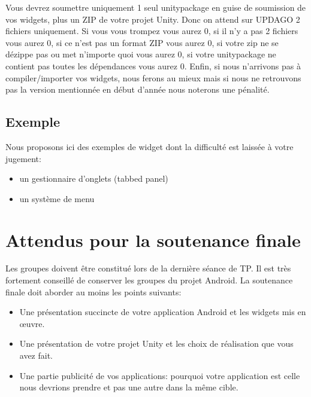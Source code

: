 \documentclass[a4paper,10pt]{article}
\begin{document}
Vous devrez soumettre uniquement 1 seul unitypackage en guise de soumission de vos widgets, plus un ZIP de votre projet Unity. Donc on attend sur UPDAGO 2 fichiers uniquement. Si vous vous trompez vous aurez 0, si il n'y a pas 2 fichiers vous aurez 0, si ce n'est pas un format ZIP vous aurez 0, si votre zip ne se dézippe pas ou met n'importe quoi vous aurez 0, si votre unitypackage ne contient pas toutes les dépendances vous aurez 0. Enfin, si nous n'arrivons pas à compiler/importer vos widgets, nous ferons au mieux mais si nous ne retrouvons pas la version mentionnée en début d'année nous noterons une pénalité.

\subsection{Exemple}

Nous proposons ici des exemples de widget dont la difficulté est laissée à votre jugement:
\begin{itemize}
	\item un gestionnaire d'onglets (tabbed panel)
	\item un système de menu
\end{itemize}

\section{Attendus pour la soutenance finale}

Les groupes doivent être constitué lors de la dernière séance de TP. Il est très fortement conseillé de conserver les groupes du projet Android. La soutenance finale doit aborder au moins les points suivants:
\begin{itemize}
	\item Une présentation succincte de votre application Android et les widgets mis en œuvre.
	\item Une présentation de votre projet Unity et les choix de réalisation que vous avez fait.
	\item Une partie publicité de vos applications: pourquoi votre application est celle nous devrions prendre et pas une autre dans la même cible.
\end{itemize}
\end{document}
